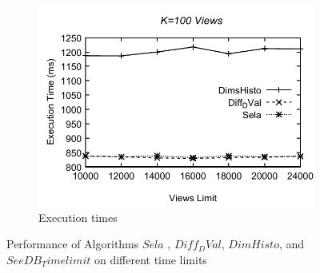 \begin{figure}
\begin{subfigure}[b]{0.32\textwidth}
    \includegraphics[width=\textwidth]{tl2.pdf}
     \caption{Execution times}
        \label{fig:tlfig2}
  \end{subfigure}
  \caption{Performance of Algorithms $Sela$ , $Diff_DVal$, $DimHisto$, and $SeeDB_Timelimit$ on different time limits}
\end{figure}





  

